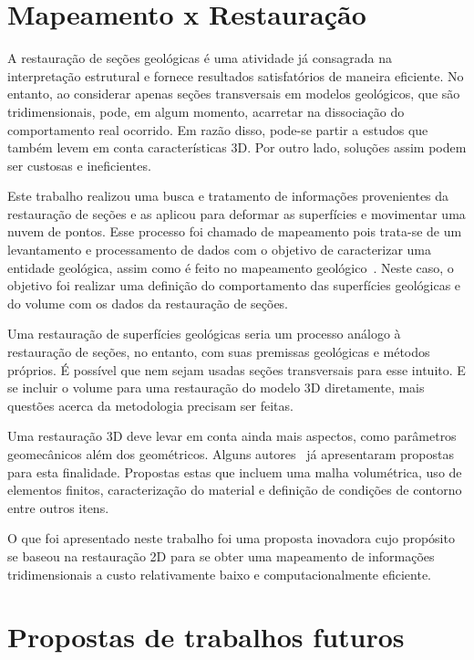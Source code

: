 \section{Mapeamento x Restauração}

A restauração de seções geológicas é uma atividade já consagrada na interpretação estrutural e fornece resultados satisfatórios de maneira eficiente. No entanto, ao considerar apenas seções transversais em modelos geológicos, que são tridimensionais, pode, em algum momento, acarretar na dissociação do comportamento real ocorrido. Em razão disso, pode-se partir a estudos que também levem em conta características 3D. Por outro lado, soluções assim podem ser custosas e ineficientes.

Este trabalho realizou uma busca e tratamento de informações provenientes da restauração de seções e as aplicou para deformar as superfícies e movimentar uma nuvem de pontos. Esse processo foi chamado de mapeamento pois trata-se de um levantamento e processamento de dados com o objetivo de caracterizar uma entidade geológica, assim como é feito no mapeamento geológico~\cite{Geoscan}. Neste caso, o objetivo foi realizar uma definição do comportamento das superfícies geológicas e do volume com os dados da restauração de seções.

Uma restauração de superfícies geológicas seria um processo análogo à restauração de seções, no entanto, com suas premissas geológicas e métodos próprios. É possível que nem sejam usadas seções transversais para esse intuito. E se incluir o volume para uma restauração do modelo 3D diretamente, mais questões acerca da metodologia precisam ser feitas. 

Uma restauração 3D deve levar em conta ainda mais aspectos, como parâmetros geomecânicos além dos geométricos. Alguns autores~\cite{Santi_3dgeological, Massot, DURANDRIARD2010441} já apresentaram propostas para esta finalidade. Propostas estas que incluem uma malha volumétrica, uso de elementos finitos, caracterização do material e definição de condições de contorno entre outros itens.

O que foi apresentado neste trabalho foi uma proposta inovadora cujo propósito se baseou na restauração 2D para se obter uma mapeamento de informações tridimensionais a custo relativamente baixo e computacionalmente eficiente.

\section{Propostas de trabalhos futuros}





